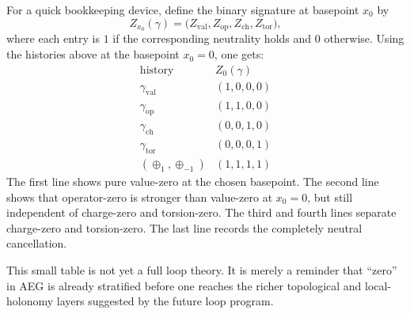 For a quick bookkeeping device, define the binary signature at basepoint $x_0$ by
\[
Z_{x_0}(\gamma)=\bigl(Z_{\mathrm{val}},Z_{\mathrm{op}},Z_{\mathrm{ch}},Z_{\mathrm{tor}}\bigr),
\]
where each entry is $1$ if the corresponding neutrality holds and $0$ otherwise.
Using the histories above at the basepoint $x_0=0$, one gets:
\[
\begin{array}{c|c}
\text{history} & Z_0(\gamma)\\
\hline
\gamma_{\mathrm{val}} & (1,0,0,0)\\
\gamma_{\mathrm{op}}  & (1,1,0,0)\\
\gamma_{\mathrm{ch}}  & (0,0,1,0)\\
\gamma_{\mathrm{tor}} & (0,0,0,1)\\
(\oplus_1,\oplus_{-1}) & (1,1,1,1)
\end{array}
\]
The first line shows pure value-zero at the chosen basepoint. The second line shows that operator-zero is stronger than value-zero at $x_0=0$, but still independent of charge-zero and torsion-zero. The third and fourth lines separate charge-zero and torsion-zero. The last line records the completely neutral cancellation.

This small table is not yet a full loop theory. It is merely a reminder that ``zero'' in AEG is already stratified before one reaches the richer topological and local-holonomy layers suggested by the future loop program.
